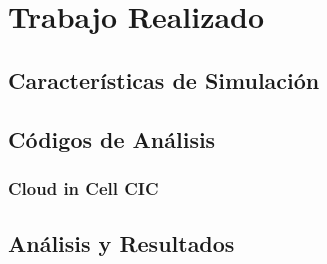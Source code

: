 \chapter{Trabajo Realizado}
\label{chap:trabajo}


\section{Características de Simulación}


\section{Códigos de Análisis}

\subsection{Cloud in Cell CIC}
\label{sub:CIC}

\section{Análisis y Resultados}

